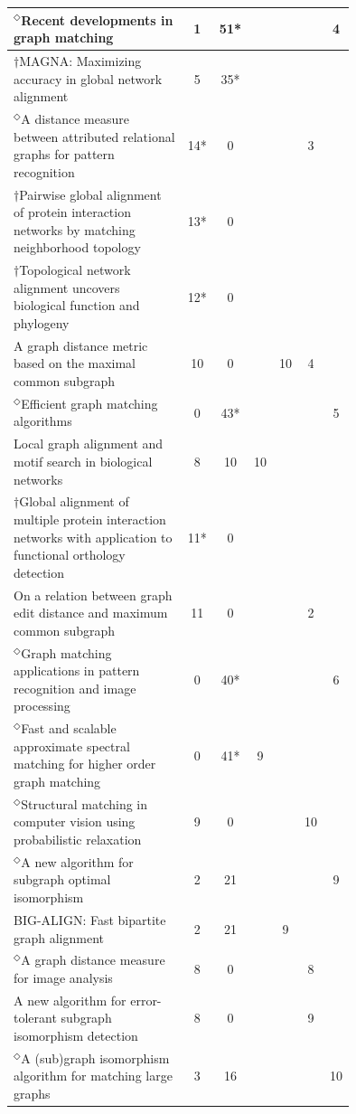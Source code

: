 \documentclass[12pt]{thesis}
\theoremstyle{plain}
\theoremstyle{definition}
\theoremstyle{remark}
\begin{document}
\begin{table}[H]
{\begin{tabular}{|L{0.75\linewidth}|c|c|c|c|c|c|}
$^\Diamond$Recent developments in graph matching  \cite{Bunke_2000} & 1 & 51* &  &  &  & 4 \\ \hline
$\dagger$MAGNA: Maximizing accuracy in global network alignment  \cite{Saraph_2014} & 5 & 35* &  &  &  &  \\ \hline
$^\Diamond$A distance measure between attributed relational graphs for pattern recognition  \cite{Sanfeliu_1983} & 14* & 0 &  &  & 3 &  \\ \hline
$\dagger$Pairwise global alignment of protein interaction networks by matching neighborhood topology  \cite{Singh_2007} & 13* & 0 &  &  &  &  \\ \hline
$\dagger$Topological network alignment uncovers biological function and phylogeny  \cite{Bunke_1998} & 12* & 0 &  &  &  &  \\ \hline
A graph distance metric based on the maximal common subgraph  \cite{Kuchaiev_2010} & 10 & 0 &  & 10 & 4 &  \\ \hline
$^\Diamond$Efficient graph matching algorithms  \cite{Messmer_1995} & 0 & 43* &  &  &  & 5 \\ \hline
Local graph alignment and motif search in biological networks  \cite{Berg_2004} & 8 & 10 & 10 &  &  &  \\ \hline
$\dagger$Global alignment of multiple protein interaction networks with application to functional orthology detection  \cite{Singh_2008} & 11* & 0 &  &  &  &  \\ \hline
On a relation between graph edit distance and maximum common subgraph  \cite{Bunke_1997} & 11 & 0 &  &  & 2 &  \\ \hline
$^\Diamond$Graph matching applications in pattern recognition and image processing  \cite{Conte_2003} & 0 & 40* &  &  &  & 6 \\ \hline
$^\Diamond$Fast and scalable approximate spectral matching for higher order graph matching  \cite{Park_2014} & 0 & 41* & 9 &  &  &  \\ \hline
$^\Diamond$Structural matching in computer vision using probabilistic relaxation  \cite{Christmas_1995} & 9 & 0 &  &  & 10 &  \\ \hline
$^\Diamond$A new algorithm for subgraph optimal isomorphism  \cite{El_Sonbaty_1998} & 2 & 21 &  &  &  & 9 \\ \hline
BIG-ALIGN: Fast bipartite graph alignment  \cite{Koutra_2013} & 2 & 21 &  & 9 &  &  \\ \hline
$^\Diamond$A graph distance measure for image analysis  \cite{Eshera_1984} & 8 & 0 &  &  & 8 &  \\ \hline
A new algorithm for error-tolerant subgraph isomorphism detection  \cite{Messmer_1998} & 8 & 0 &  &  & 9 &  \\ \hline
$^\Diamond$A (sub)graph isomorphism algorithm for matching large graphs  \cite{Cordella_2004} & 3 & 16 &  &  &  & 10 \\ \hline
\end{tabular}

}
\end{table}
\end{document}
